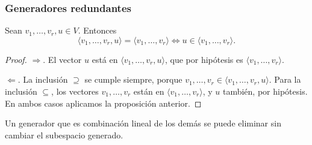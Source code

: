 \begin{frame}
    \frametitle{Generadores redundantes}

    \begin{corollary}
        Sean $v_1,\ldots,v_r,u\in V$. Entonces
        \[
            \langle v_1,\ldots,v_r,u\rangle=\langle v_1,\ldots,v_r\rangle
            \iff
            u\in\langle v_1,\ldots,v_r\rangle.
        \]
    \end{corollary}

    \begin{proof}
        \alert{$\Rightarrow$.} El vector $u$ está en
        $\langle v_1,\ldots,v_r,u\rangle$, que por hipótesis es
        $\langle v_1,\ldots,v_r\rangle$.

        \alert{$\Leftarrow$.} La inclusión $\supseteq$ se cumple siempre,
        porque $v_1,\ldots,v_r\in\langle v_1,\ldots,v_r,u\rangle$. Para la
        inclusión $\subseteq$, los vectores $v_1,\ldots,v_r$ están en
        $\langle v_1,\ldots,v_r\rangle$, y $u$ también, por hipótesis.
        En ambos casos aplicamos la proposición anterior.
    \end{proof}

    \medskip

    Un generador que es combinación lineal de los demás se puede
    \alert{eliminar} sin cambiar el subespacio generado.
\end{frame}

